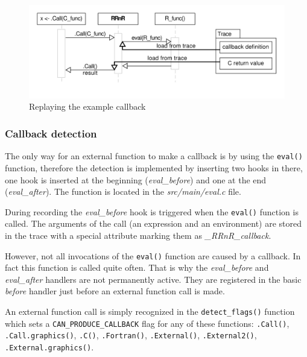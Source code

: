 \documentclass[thesis=M,english,hidelinks]{FITthesis}[2012/10/20]
\begin{document}
		\vspace{-10pt}
		\begin{figure}[ht]\centering
			\setlength{\abovecaptionskip}{-15pt}
			\includegraphics[width=1.0\textwidth]{img/callbacks2}
			\caption{Replaying the example callback}\label{fig:callbacks2}
		\end{figure}
		\FloatBarrier
		
			\subsubsection{Callback detection}\label{eval_handler}
			The only way for an external function to make a callback is by using the \lstinline|eval()| function, therefore the detection is implemented by inserting two hooks in there, one hook is inserted at the beginning (\emph{eval\_before}) and one at the end (\emph{eval\_after}). The function is located in the \emph{src/main/eval.c} file.\par
			
			During recording the \emph{eval\_before} hook is triggered when the \lstinline|eval()| function is called. The arguments of the call (an expression and an environment) are stored in the trace with a special attribute marking them as \emph{\_RRnR\_callback}.\par
			
			However, not all invocations of the \lstinline|eval()| function are caused by a callback. In fact this function is called quite often. That is why the \emph{eval\_before} and \emph{eval\_after} handlers are not permanently active. They are registered in the basic \emph{before} handler just before an external function call is made.\par
			
			An external function call is simply recognized in the \lstinline|detect_flags()| function which sets a \lstinline|CAN_PRODUCE_CALLBACK| flag for any of these functions: \lstinline|.Call()|, \lstinline|.Call.graphics()|, \lstinline|.C()|, \lstinline|.Fortran()|, \lstinline|.External()|, \lstinline|.External2()|,\\\lstinline|.External.graphics()|.\par
			
\end{document}
